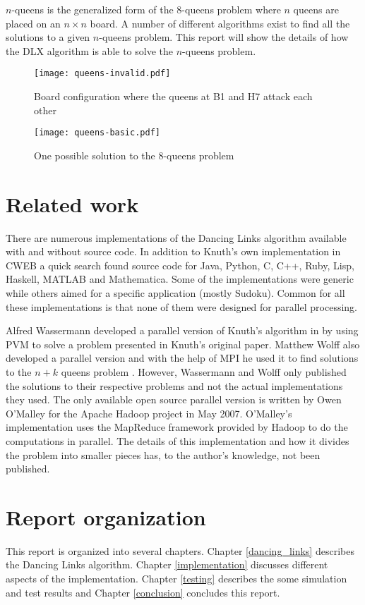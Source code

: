 $n$-queens is the generalized form of the 8-queens problem where $n$ queens are placed on an $n \times n$ board.
A number of different algorithms exist to find all the solutions to a given $n$-queens problem.
This report will show the details of how the DLX algorithm is able to solve the $n$-queens problem.

\begin{figure}[hptb]
	\centering 
	\texttt{[image: queens-invalid.pdf]}
	\caption{Board configuration where the queens at B1 and H7 attack each other}
	\label{fig:8queens-invalid}
\end{figure}

\begin{figure}[hptb]
	\centering 
	\texttt{[image: queens-basic.pdf]}
	\caption{One possible solution to the 8-queens problem}
	\label{fig:8queens}
\end{figure}



\section{Related work}

There are numerous implementations of the Dancing Links algorithm available with and without source code.
In addition to Knuth's own implementation in CWEB \cite{cweb} a quick search found source code for Java, Python, C, C++, Ruby, Lisp, Haskell, MATLAB and Mathematica.
Some of the implementations were generic while others aimed for a specific application (mostly Sudoku).
Common for all these implementations is that none of them were designed for parallel processing.

Alfred Wassermann developed a parallel version of Knuth's algorithm in \cite{wassermann99covering} by using PVM \cite{pvm} to solve a problem presented in Knuth's original paper.
Matthew Wolff also developed a parallel version and with the help of MPI \cite{QuinnMPI} he used it to find solutions to the $n+k$ queens problem \cite{ChathamQueens}.
However, Wassermann and Wolff only published the solutions to their respective problems and not the actual implementations they used.
The only available open source parallel version is written by Owen O'Malley for the Apache Hadoop project \cite{hadoop} in May 2007.
O'Malley's implementation uses the MapReduce framework \cite{map-reduce} provided by Hadoop to do the computations in parallel.
The details of this implementation and how it divides the problem into smaller pieces has, to the author's knowledge, not been published.



\section{Report organization}

This report is organized into several chapters.
Chapter \ref{dancing_links} describes the Dancing Links algorithm.
Chapter \ref{implementation} discusses different aspects of the implementation.
Chapter \ref{testing} describes the some simulation and test results and Chapter \ref{conclusion} concludes this report.
